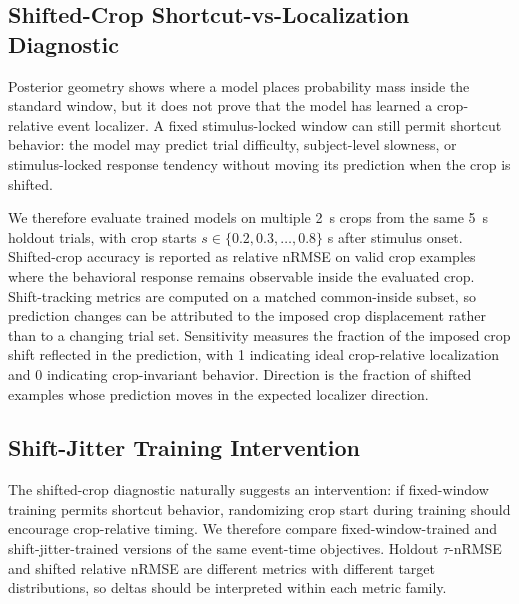 \documentclass[12pt]{article}
\begin{document}
\subsection{Shifted-Crop Shortcut-vs-Localization Diagnostic}

Posterior geometry shows where a model places probability mass inside the standard window, but it does not prove that the model has learned a crop-relative event localizer. A fixed stimulus-locked window can still permit shortcut behavior: the model may predict trial difficulty, subject-level slowness, or stimulus-locked response tendency without moving its prediction when the crop is shifted.

We therefore evaluate trained models on multiple 2~s crops from the same 5~s holdout trials, with crop starts \(s\in\{0.2,0.3,\dots,0.8\}\) s after stimulus onset. Shifted-crop accuracy is reported as relative nRMSE on valid crop examples where the behavioral response remains observable inside the evaluated crop. Shift-tracking metrics are computed on a matched common-inside subset, so prediction changes can be attributed to the imposed crop displacement rather than to a changing trial set. Sensitivity measures the fraction of the imposed crop shift reflected in the prediction, with 1 indicating ideal crop-relative localization and 0 indicating crop-invariant behavior. Direction is the fraction of shifted examples whose prediction moves in the expected localizer direction.

\subsection{Shift-Jitter Training Intervention}

The shifted-crop diagnostic naturally suggests an intervention: if fixed-window training permits shortcut behavior, randomizing crop start during training should encourage crop-relative timing. We therefore compare fixed-window-trained and shift-jitter-trained versions of the same event-time objectives. Holdout \(\tau\)-nRMSE and shifted relative nRMSE are different metrics with different target distributions, so deltas should be interpreted within each metric family.
\end{document}
